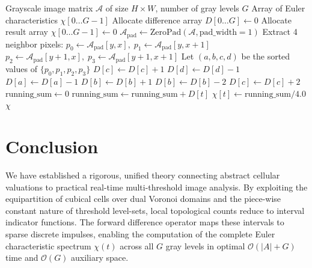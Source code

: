 \documentclass[11pt,a4paper]{article}
\theoremstyle{plain}
\theoremstyle{definition}
\theoremstyle{remark}
\begin{document}
\begin{algorithm}[H]
\caption{Linear-Time Multi-Threshold Euler Characteristic Curve}\label{alg:fast_euler_diff}
\begin{algorithmic}[1]
\Require Grayscale image matrix $\mathcal{A}$ of size $H \times W$, number of gray levels $G$
\Ensure Array of Euler characteristics $\chi[0 \dots G-1]$
\State Allocate difference array $D[0 \dots G] \gets 0$
\State Allocate result array $\chi[0 \dots G-1] \gets 0$
\State $\mathcal{A}_{\text{pad}} \gets \text{ZeroPad}(\mathcal{A}, \text{pad\_width}=1)$
        \State Extract 4 neighbor pixels: $p_0 \gets \mathcal{A}_{\text{pad}}[y, x], \; p_1 \gets \mathcal{A}_{\text{pad}}[y, x+1]$
        \State \phantom{Extract 4 neighbor pixels:} $p_2 \gets \mathcal{A}_{\text{pad}}[y+1, x], \; p_3 \gets \mathcal{A}_{\text{pad}}[y+1, x+1]$
        \State Let $(a, b, c, d)$ be the sorted values of $\{p_0, p_1, p_2, p_3\}$
         
            \State $D[c] \gets D[c] + 1$
            \State $D[d] \gets D[d] - 1$
        \EndIf
         
            \State $D[a] \gets D[a] - 1$
            \State $D[b] \gets D[b] + 1$
        \EndIf
         
                \State $D[b] \gets D[b] - 2$
                \State $D[c] \gets D[c] + 2$
            \EndIf
        \EndIf
    \EndFor
\EndFor
\State $\text{running\_sum} \gets 0$
 
    \State $\text{running\_sum} \gets \text{running\_sum} + D[t]$
    \State $\chi[t] \gets \text{running\_sum} / 4.0$
\EndFor
\State \Return $\chi$
\end{algorithmic}
\end{algorithm}

\section{Conclusion}

We have established a rigorous, unified theory connecting abstract cellular valuations to practical real-time multi-threshold image analysis. By exploiting the equipartition of cubical cells over dual Voronoi domains and the piece-wise constant nature of threshold level-sets, local topological counts reduce to interval indicator functions. The forward difference operator maps these intervals to sparse discrete impulses, enabling the computation of the complete Euler characteristic spectrum $\chi(t)$ across all $G$ gray levels in optimal $\mathcal{O}(|A| + G)$ time and $\mathcal{O}(G)$ auxiliary space.
\end{document}
